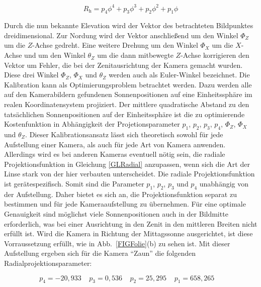 \documentclass[a4paper,11pt,twoside,german]{article}
\newcommand{\absatz}{\smallbreak}
\begin{document}
\begin{equation}
\label{GLRadial}
R_\mathrm{h} = p_4 \phi ^ 4 + p_3 \phi ^ 3 + p_2 \phi ^ 2 + p_1 \phi
\end{equation}

Durch die nun bekannte Elevation wird der Vektor des betrachteten Bildpunktes
dreidimensional. Zur Nordung wird der Vektor anschließend um den Winkel $\Phi_Z$
um die $Z$-Achse gedreht. Eine weitere Drehung um den Winkel $\Phi_X$ um die
$X$-Achse und um den Winkel $\theta_Z$ um die dann mitbewegte $Z$-Achse
korrigieren den Vektor um Fehler, die bei der Ze\-nit\-aus\-rich\-tung der
Kamera gemacht wurden. Diese drei Winkel $\Phi_Z$, $\Phi_X$ und $\theta_Z$
werden auch als Euler-Winkel bezeichnet.
\absatz
Die Kalibration kann als Optimierungsproblem betrachtet werden. Dazu
werden alle auf den Kamerabildern gefundenen Sonnenpositionen auf eine
Einheitssphäre im realen Koordinatensystem projiziert. Der mittlere quadratische
Abstand zu den tatsächlichen Sonnenpositionen auf der Einheitssphäre ist die zu
optimierende Kostenfunktion in Ab\-häng\-ig\-keit der Projetionsparameter $p_1$,
$p_2$, $p_3$, $p_4$, $\Phi_Z$, $\Phi_X$ und $\theta_Z$.
\absatz
Dieser Kalibrationsansatz lässt sich theoretisch sowohl für jede Aufstellung
einer Kamera, als auch für jede Art von Kamera anwenden. Allerdings wird es bei
anderen Kameras eventuell nötig sein, die radiale Projektionsfunktion in
Gleichung \ref{GLRadial} anzupassen, wenn sich die Art der Linse stark von der
hier verbauten unterscheidet.
\absatz
Die radiale Projektionsfunktion ist gerätespezifisch. Somit sind die Parameter 
$p_1$, $p_2$, $p_3$ und $p_4$ unabhängig von der Aufstellung. Daher bietet es
sich an, die Projektionsfunktion separat zu bestimmen und für jede
Kameraaufstellung zu übernehmen. Für eine optimale Genauigkeit sind
möglichst viele Sonnenpositionen auch in der Bildmitte erforderlich, was bei
einer Ausrichtung in den Zenit in den mittleren Breiten nicht erfüllt ist.
Wird die Kamera in Richtung der Mittagssonne ausgerichtet, ist diese
Vorraussetzung erfüllt, wie in Abb.~\ref{FIGFolie}(b) zu sehen ist.
Mit dieser Aufstellung ergeben sich für die Kamera \enquote{Zaun} 
die folgenden Radialprojektionsparameter:

\begin{equation}
p_4 = -20,933 \;\;\;\;
p_3 = 0,536   \;\;\;\;
p_2 = 25,295  \;\;\;\;
p_1 = 658,265 \;\;\;\;
\end{equation}
\end{document}
